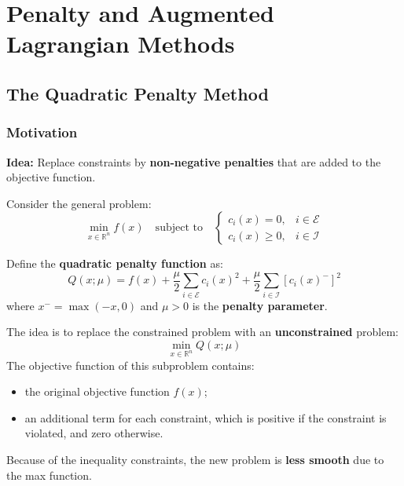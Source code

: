 \chapter{Penalty and Augmented Lagrangian Methods}
\label{chap:penalty-augmented-lagrangian}

\section{The Quadratic Penalty Method}

\subsection{Motivation}

\textbf{Idea:} Replace constraints by \textbf{non-negative penalties} that are added to the objective function.

Consider the general problem:
\begin{equation}
    \min_{x \in \mathbb{R}^n} f(x) \quad \text{subject to} \quad
    \begin{cases}
        c_i(x) = 0, & i \in \mathcal{E} \\
        c_i(x) \ge 0, & i \in \mathcal{I}
    \end{cases}
\end{equation}

Define the \textbf{quadratic penalty function} as:
\begin{equation}
    Q(x; \mu) = f(x) + \frac{\mu}{2} \sum_{i \in \mathcal{E}} c_i(x)^2 + \frac{\mu}{2} \sum_{i \in \mathcal{I}} \left[ c_i(x)^- \right]^2
\end{equation}
where $x^- = \max(-x, 0)$ and $\mu > 0$ is the \textbf{penalty parameter}.

The idea is to replace the constrained problem with an \textbf{unconstrained} problem:
\begin{equation}
    \min_{x \in \mathbb{R}^n} Q(x; \mu)
\end{equation}
The objective function of this subproblem contains:
\begin{itemize}
    \item the original objective function $f(x)$;
    \item an additional term for each constraint, which is positive if the constraint is violated, and zero otherwise.
\end{itemize}

\begin{remarque}
    Because of the inequality constraints, the new problem is \textbf{less smooth} due to the max function.
\end{remarque}

